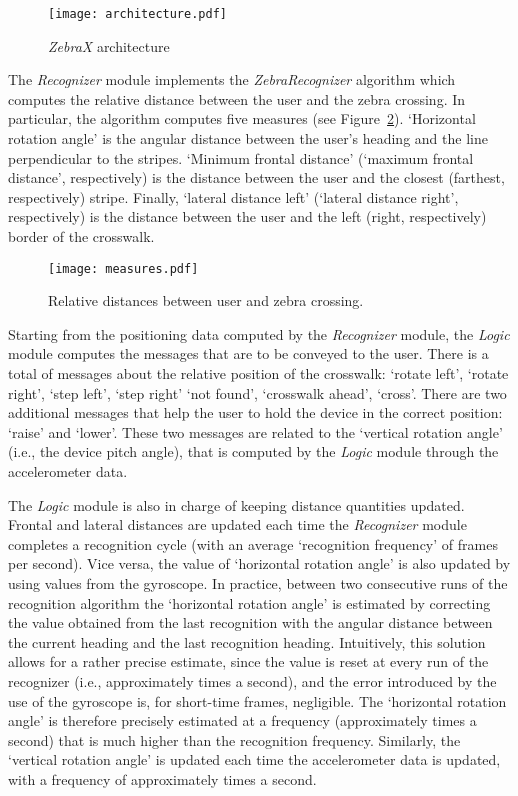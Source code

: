 \documentclass{article}
\newcommand{\recognizer}{\emph{Recognizer}}
\newcommand{\logic}{\emph{Logic}}
\newcommand{\zebra}{\emph{ZebraX}}
\begin{document}
\begin{figure}[t!]
	\centering
		\texttt{[image: architecture.pdf]}
	\caption[]{\zebra{} architecture}
	\label{fig:architecture}
\end{figure}

The \recognizer{} module implements the \emph{ZebraRecognizer} algorithm \cite{AhmetovicICPR2014} which computes the relative distance between the user and the zebra crossing.
In particular, the algorithm computes five measures (see Figure~\ref{fig:distances}).
`Horizontal rotation angle' is the angular distance between the user's heading and the line perpendicular to the stripes.
`Minimum frontal distance' (`maximum frontal distance', respectively) is the distance between the user and the closest (farthest, respectively) stripe.
Finally, `lateral distance left' (`lateral distance right', respectively) is the distance between the user and the left (right, respectively) border of the crosswalk. 

\begin{figure}[t!]
	\centering
		\texttt{[image: measures.pdf]}
	\caption[]{Relative distances between user and zebra crossing.}
	\label{fig:distances}
\end{figure}

Starting from the positioning data computed by the \recognizer{} module, the \logic{} module computes the messages that are to be conveyed to the user.
There is a total of  messages about the relative position of the crosswalk: `rotate left', `rotate right', `step left', `step right' `not found', `crosswalk ahead', `cross'.
There are two additional messages that help the user to hold the device in the correct position: `raise' and `lower'. These two messages are related to the `vertical rotation angle' (i.e., the device pitch angle), that is computed by the \logic{} module through the accelerometer data.

The \logic{} module is also in charge of keeping distance quantities updated.
Frontal and lateral distances are updated each time the \recognizer{} module completes a recognition cycle (with an average `recognition frequency' of  frames per second).
Vice versa, the value of `horizontal rotation angle' is also updated by using values from the gyroscope. In practice, between two consecutive runs of the recognition algorithm the `horizontal rotation angle' is estimated by correcting the value obtained from the last recognition with the angular distance between the current heading and the last recognition heading.
Intuitively, this solution allows for a rather precise estimate, since the value is reset at every run of the recognizer (i.e., approximately  times a second), and the error introduced by the use of the gyroscope is, for short-time frames, negligible.
The `horizontal rotation angle' is therefore precisely estimated at a frequency (approximately  times a second) that is much higher than the recognition frequency.
Similarly, the `vertical rotation angle' is updated each time the accelerometer data is updated, with a frequency of approximately  times a second.
\end{document}
